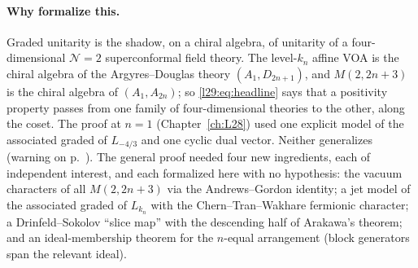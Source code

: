 \paragraph{Why formalize this.} Graded unitarity is the shadow, on a chiral algebra, of unitarity of a
four-dimensional $\mathcal N=2$ superconformal field theory. The level-$k_n$ affine VOA is the chiral algebra of the
Argyres--Douglas theory $(A_1,D_{2n+1})$, and $M(2,2n+3)$ is the chiral algebra of $(A_1,A_{2n})$; so
\eqref{l29:eq:headline} says that a positivity property passes from one family of four-dimensional theories to the
other, along the coset. The proof at $n=1$ (Chapter~\ref{ch:L28}) used one explicit model of the associated graded
of $L_{-4/3}$ and one cyclic dual vector. Neither generalizes (warning on p.~\pageref{l29:warn:cyclic}). The general proof
needed four new ingredients, each of independent interest, and each formalized here with no hypothesis: the vacuum
characters of all $M(2,2n+3)$ via the Andrews--Gordon identity; a jet model of the associated graded of $L_{k_n}$ with
the Chern--Tran--Wakhare fermionic character; a Drinfeld--Sokolov ``slice map'' with the descending half of Arakawa's
theorem; and an ideal-membership theorem for the $n$-equal arrangement (block generators span the relevant ideal).

